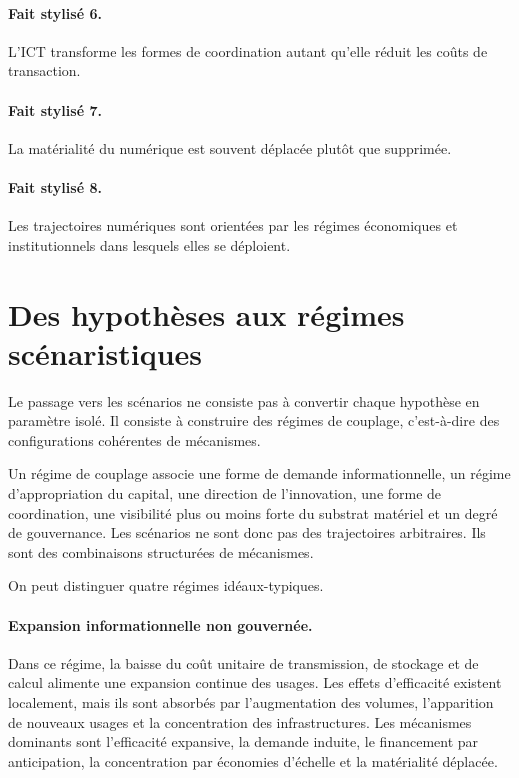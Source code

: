 \paragraph{Fait stylisé 6.}
L'ICT transforme les formes de coordination autant qu'elle réduit les coûts de transaction.

\paragraph{Fait stylisé 7.}
La matérialité du numérique est souvent déplacée plutôt que supprimée.

\paragraph{Fait stylisé 8.}
Les trajectoires numériques sont orientées par les régimes économiques et institutionnels dans lesquels elles se déploient.

\section{Des hypothèses aux régimes scénaristiques}

Le passage vers les scénarios ne consiste pas à convertir chaque hypothèse en paramètre isolé. Il consiste à construire des régimes de couplage, c'est-à-dire des configurations cohérentes de mécanismes.

Un régime de couplage associe une forme de demande informationnelle, un régime d'appropriation du capital, une direction de l'innovation, une forme de coordination, une visibilité plus ou moins forte du substrat matériel et un degré de gouvernance. Les scénarios ne sont donc pas des trajectoires arbitraires. Ils sont des combinaisons structurées de mécanismes.

On peut distinguer quatre régimes idéaux-typiques.

\paragraph{Expansion informationnelle non gouvernée.}
Dans ce régime, la baisse du coût unitaire de transmission, de stockage et de calcul alimente une expansion continue des usages. Les effets d'efficacité existent localement, mais ils sont absorbés par l'augmentation des volumes, l'apparition de nouveaux usages et la concentration des infrastructures. Les mécanismes dominants sont l'efficacité expansive, la demande induite, le financement par anticipation, la concentration par économies d'échelle et la matérialité déplacée.

